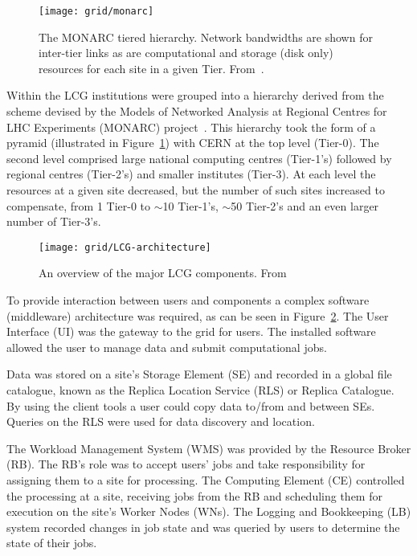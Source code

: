 \begin{figure}[tb]
  \centering
  \texttt{[image: grid/monarc]}
  \caption{The MONARC tiered hierarchy. Network bandwidths are shown for inter-tier links as are computational and storage (disk only) resources for each site in a given Tier. From~\cite{citeulike:421138}.
  \label{fig:monarc}}
\end{figure}

Within the LCG institutions were grouped into a hierarchy derived from the scheme devised by the Models of Networked Analysis at Regional Centres for LHC Experiments (MONARC) project~\cite{Aderholz:2000nk}. This hierarchy took the form of a pyramid (illustrated in Figure~\ref{fig:monarc}) with CERN at the top level (Tier-0). The second level comprised large national computing centres (Tier-1's) followed by regional centres (Tier-2's) and smaller institutes (Tier-3). At each level the resources at a given site decreased, but the number of such sites increased to compensate, from 1 Tier-0 to $\sim$10 Tier-1's, $\sim$50 Tier-2's and an even larger number of Tier-3's.

\begin{figure}[tb]
  \centering
  \texttt{[image: grid/LCG-architecture]}
  \caption{An overview of the major LCG components. From ~\cite{citeulike:833648}
  \label{fig:LCG-architecture}}
\end{figure}

To provide interaction between users and components a complex software (middleware) architecture was required, as can be seen in Figure~\ref{fig:LCG-architecture}. The User Interface (UI) was the gateway to the grid for users. The installed software allowed the user to manage data and submit computational jobs. 

Data was stored on a site's Storage Element (SE) and recorded in a global file catalogue, known as the Replica Location Service (RLS) or Replica Catalogue. By using the client tools a user could copy data to/from and between SEs. Queries on the RLS were used for data discovery and location.

The Workload Management System (WMS) was provided by the Resource Broker (RB). The RB's role was to accept users' jobs and take responsibility for assigning them to a site for processing. The Computing Element (CE) controlled the processing at a site, receiving jobs from the RB and scheduling them for execution on the site's Worker Nodes (WNs). The Logging and Bookkeeping (LB) system recorded changes in job state and was queried by users to determine the state of their jobs.

